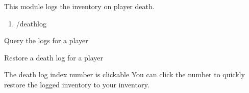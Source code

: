
This module logs the inventory on player death.

\begin{enumerate}
    \item /deathlog
\end{enumerate}


\begin{example}{Query the logs for a player}
\end{example}

\begin{example}{Restore a death log for a player}
\end{example}

\begin{tips}{The death log index number is clickable}
    You can click the number to quickly restore the logged inventory to your inventory.
\end{tips}